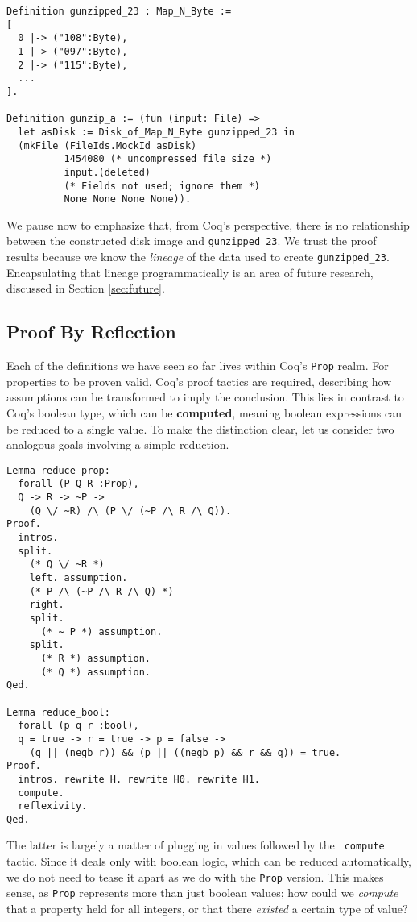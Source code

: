 \documentclass[nocopyrightspace]{sigplanconf}
\begin{document}
\begin{lstlisting}
Definition gunzipped_23 : Map_N_Byte := 
[ 
  0 |-> ("108":Byte), 
  1 |-> ("097":Byte), 
  2 |-> ("115":Byte), 
  ...
].

Definition gunzip_a := (fun (input: File) => 
  let asDisk := Disk_of_Map_N_Byte gunzipped_23 in
  (mkFile (FileIds.MockId asDisk)
          1454080 (* uncompressed file size *)
          input.(deleted) 
          (* Fields not used; ignore them *)
          None None None None)).
\end{lstlisting}

We pause now to emphasize that, from Coq's perspective, there is no
relationship between the constructed disk image and {\tt gunzipped\_23}. We
trust the proof results because we know the {\em lineage} of the data used to
create {\tt gunzipped\_23}. Encapsulating that lineage programmatically is an
area of future research, discussed in Section \ref{sec:future}.

\subsection{Proof By Reflection}
\label{subsec:reflection}

Each of the definitions we have seen so far lives within Coq's {\tt Prop}
realm. For properties to be proven valid, Coq's proof tactics are required,
describing how assumptions can be transformed to imply the conclusion. This
lies in contrast to Coq's boolean type, which can be {\bf computed}, meaning
boolean expressions can be reduced to a single value. To make the distinction
clear, let us consider two analogous goals involving a simple reduction.

\begin{lstlisting}
Lemma reduce_prop:
  forall (P Q R :Prop),
  Q -> R -> ~P ->
    (Q \/ ~R) /\ (P \/ (~P /\ R /\ Q)).
Proof.
  intros.
  split.
    (* Q \/ ~R *)
    left. assumption.
    (* P /\ (~P /\ R /\ Q) *)
    right. 
    split.
      (* ~ P *) assumption.
    split.
      (* R *) assumption.
      (* Q *) assumption.
Qed.

Lemma reduce_bool:
  forall (p q r :bool),
  q = true -> r = true -> p = false ->
    (q || (negb r)) && (p || ((negb p) && r && q)) = true.
Proof.
  intros. rewrite H. rewrite H0. rewrite H1.
  compute.
  reflexivity.
Qed.
\end{lstlisting}

The latter is largely a matter of plugging in values followed by the {\tt
compute} tactic. Since it deals only with boolean logic, which can be reduced
automatically, we do not need to tease it apart as we do with the {\tt Prop}
version. This makes sense, as {\tt Prop} represents more than just boolean
values; how could we {\em compute} that a property held for all integers, or
that there {\em existed} a certain type of value?
\end{document}

